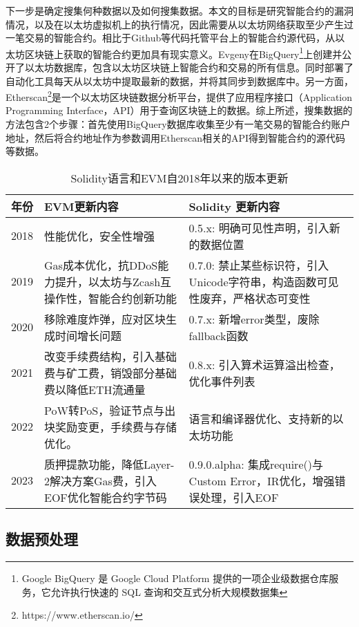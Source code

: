 下一步是确定搜集何种数据以及如何搜集数据。本文的目标是研究智能合约的漏洞情况，以及在以太坊虚拟机上的执行情况，因此需要从以太坊网络获取至少产生过一笔交易的智能合约。相比于Github等代码托管平台上的智能合约源代码，从以太坊区块链上获取的智能合约更加具有现实意义。Evgeny\cite{bigquery_ethereum}在BigQuery\footnote{Google BigQuery 是 Google Cloud Platform 提供的一项企业级数据仓库服务，它允许执行快速的 SQL 查询和交互式分析大规模数据集}上创建并公开了以太坊数据库，包含以太坊区块链上智能合约和交易的所有信息。同时部署了自动化工具每天从以太坊中提取最新的数据，并将其同步到数据库中。另一方面，Etherscan\footnote{https://www.etherscan.io/}是一个以太坊区块链数据分析平台，提供了应用程序接口（Application Programming Interface，API）用于查询区块链上的数据。综上所述，搜集数据的方法包含2个步骤：首先使用BigQuery数据库收集至少有一笔交易的智能合约账户地址，然后将合约地址作为参数调用Etherscan相关的API得到智能合约的源代码等数据。
\begin{table}[htbp]
    \caption{\label{tab:solidity_evm_update}Solidity语言和EVM自2018年以来的版本更新}
    \small
    \renewcommand{\arraystretch}{1.5}
    \begin{tabularx}{\linewidth}{p{1cm}p{7cm}<{\raggedright}X<{\raggedright}}
    \hline
    \textbf{年份} & \textbf{EVM更新内容} & \textbf{Solidity 更新内容} \\ \hline
    2018 & 性能优化，安全性增强 & 0.5.x: 明确可见性声明，引入新的数据位置 \\ \hline
    2019 & Gas成本优化，抗DDoS能力提升，以太坊与Zcash互操作性，智能合约创新功能 & 0.7.0: 禁止某些标识符，引入Unicode字符串，构造函数可见性废弃，严格状态可变性 \\ \hline
    2020 & 移除难度炸弹，应对区块生成时间增长问题 & 0.7.x: 新增error类型，废除fallback函数 \\ \hline
    2021 & 改变手续费结构，引入基础费与矿工费，销毁部分基础费以降低ETH流通量 & 0.8.x: 引入算术运算溢出检查，优化事件列表 \\ \hline
    2022 & PoW转PoS，验证节点与出块奖励变更，手续费与存储优化。 & 语言和编译器优化、支持新的以太坊功能 \\ \hline
    2023 & 质押提款功能，降低Layer-2解决方案Gas费，引入EOF优化智能合约字节码 & 0.9.0.alpha: 集成require()与Custom Error，IR优化，增强错误处理，引入EOF \\ \hline
    \end{tabularx}
    \end{table}
\subsection{数据预处理}
\label{sec:数据预处理}

